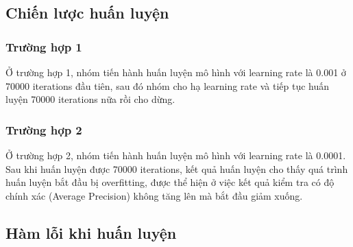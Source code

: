 \subsection{Chiến lược huấn luyện}
\subsubsection{Trường hợp 1}
Ở trường hợp 1, nhóm tiến hành huấn luyện mô hình với learning rate là 0.001 ở 70000 iterations đầu tiên, sau đó nhóm cho hạ learning rate và tiếp tục huấn luyện 70000 iterations nữa rồi cho dừng. 
\subsubsection{Trường hợp 2}
Ở trường hợp 2, nhóm tiến hành huấn luyện mô hình với learning rate là 0.0001.
Sau khi huấn luyện được 70000 iterations, kết quả huấn luyện cho thấy quá trình huấn luyện bắt đầu bị overfitting, được thể hiện ở việc kết quả kiểm tra có độ chính xác (Average Precision) không tăng lên mà bắt đầu giảm xuống.
\cleardoublepage
\subsection{Hàm lỗi khi huấn luyện}
